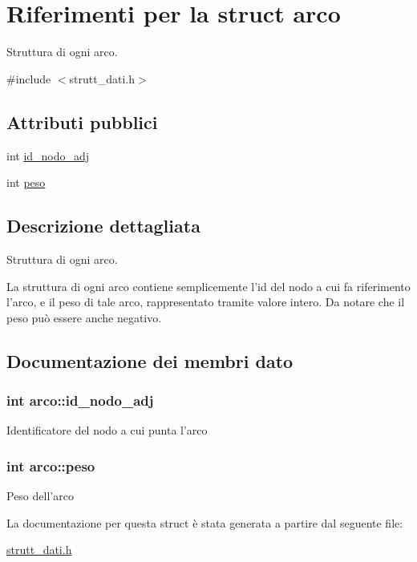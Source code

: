 \hypertarget{structarco}{\section{Riferimenti per la struct arco}
\label{structarco}
}


Struttura di ogni arco.  




{\ttfamily \#include $<$strutt\-\_\-dati.\-h$>$}

\subsection*{Attributi pubblici}
\begin{DoxyCompactItemize}
\item 
int \hyperlink{structarco_ad9b7c14e1afd37cc4c416267859c0fd7}{id\-\_\-nodo\-\_\-adj}
\item 
int \hyperlink{structarco_a3d3e3a63742e8fbaf47a728e066eca98}{peso}
\end{DoxyCompactItemize}


\subsection{Descrizione dettagliata}
Struttura di ogni arco. 

La struttura di ogni arco contiene semplicemente l'id del nodo a cui fa riferimento l'arco, e il peso di tale arco, rappresentato tramite valore intero. Da notare che il peso può essere anche negativo. 

\subsection{Documentazione dei membri dato}
\hypertarget{structarco_ad9b7c14e1afd37cc4c416267859c0fd7}{
\subsubsection[{id\-\_\-nodo\-\_\-adj}]{\setlength{\rightskip}{0pt plus 5cm}int arco\-::id\-\_\-nodo\-\_\-adj}}\label{structarco_ad9b7c14e1afd37cc4c416267859c0fd7}
Identificatore del nodo a cui punta l'arco \hypertarget{structarco_a3d3e3a63742e8fbaf47a728e066eca98}{
\subsubsection[{peso}]{\setlength{\rightskip}{0pt plus 5cm}int arco\-::peso}}\label{structarco_a3d3e3a63742e8fbaf47a728e066eca98}
Peso dell'arco 

La documentazione per questa struct è stata generata a partire dal seguente file\-:\begin{DoxyCompactItemize}
\item 
\hyperlink{strutt__dati_8h}{strutt\-\_\-dati.\-h}\end{DoxyCompactItemize}
